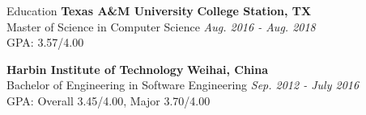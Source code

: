 \documentclass{resume} %
\begin{document}

\begin{rSection}{Education}
{\bf Texas A\&M University} \hfill {\bf College Station, TX} 
\\ Master of Science in Computer Science \hfill {\em Aug. 2016 - Aug. 2018}
\\ GPA: 3.57/4.00
\vspace*{-0.2em}

{\bf Harbin Institute of Technology} \hfill {\bf Weihai, China} 
\\ Bachelor of Engineering in Software Engineering \hfill {\em Sep. 2012 - July 2016}
\\ GPA: Overall 3.45/4.00, Major 3.70/4.00



\end{rSection}



\end{document}
